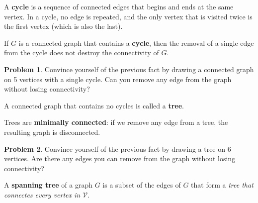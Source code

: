 \documentclass[11pt]{article}
\theoremstyle{definition}
\newtheorem{problem}{Problem}
\newcommand{\answerbox}[3]{%
  \fbox{%
    \begin{minipage}[#1]{#2}
      \hfill\vspace{#3}
    \end{minipage}
  }
}
\newcommand{\answerboxone}[2]{%
  \answerbox{#1}{6.0in}{#2} 
}
\begin{document}
\begin{tcolorbox}
A \textbf{cycle} is a sequence of connected edges that begins and ends at the same vertex.  In a cycle, no edge is repeated, and the only vertex that is visited twice is the first vertex (which is also the last).
\end{tcolorbox}

\begin{tcolorbox}
If $G$ is a connected graph that contains a \textbf{cycle}, then the removal of a single edge from the cycle does not destroy the connectivity of $G$.
\end{tcolorbox}

\begin{problem} Convince yourself of the previous fact by drawing a connected graph on 5 vertices with a single cycle.  Can you remove any edge from the graph without losing connectivity?

\answerboxone{c}{6cm}
\end{problem}


\begin{tcolorbox}
A connected graph that contains no cycles is called a \textbf{tree}.  
\end{tcolorbox}

\begin{tcolorbox}
Trees are \textbf{minimally connected}:  if we remove any edge from a tree, the resulting graph is disconnected.
\end{tcolorbox}
\begin{problem} Convince yourself of the previous fact by drawing a tree on 6 vertices.  Are there any edges you can remove from the graph without losing connectivity?

\answerboxone{c}{6cm}
\end{problem}

\newpage
\begin{tcolorbox}
A \textbf{spanning tree} of a graph $G$ is a subset of the edges of $G$ that form a 
\emph{tree that connectes every vertex in $\mathcal{V}$}.
\end{tcolorbox}
\end{document}
